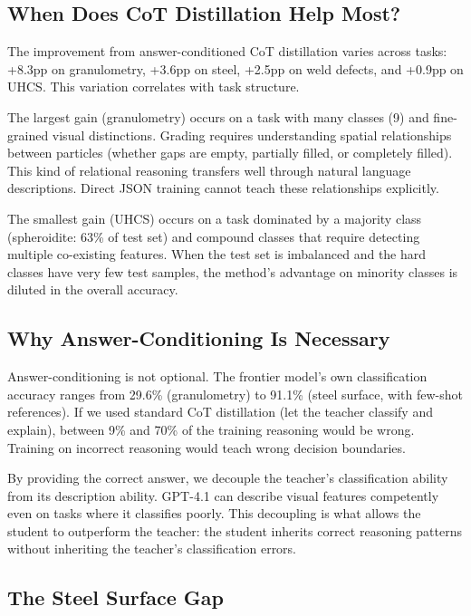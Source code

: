\documentclass{bmvc2k}
\begin{document}
\subsection{When Does CoT Distillation Help Most?}

The improvement from answer-conditioned CoT distillation varies across tasks: +8.3pp on granulometry, +3.6pp on steel, +2.5pp on weld defects, and +0.9pp on UHCS. This variation correlates with task structure.

The largest gain (granulometry) occurs on a task with many classes (9) and fine-grained visual distinctions. Grading requires understanding spatial relationships between particles (whether gaps are empty, partially filled, or completely filled). This kind of relational reasoning transfers well through natural language descriptions. Direct JSON training cannot teach these relationships explicitly.

The smallest gain (UHCS) occurs on a task dominated by a majority class (spheroidite: 63\% of test set) and compound classes that require detecting multiple co-existing features. When the test set is imbalanced and the hard classes have very few test samples, the method's advantage on minority classes is diluted in the overall accuracy.

\subsection{Why Answer-Conditioning Is Necessary}

Answer-conditioning is not optional. The frontier model's own classification accuracy ranges from 29.6\% (granulometry) to 91.1\% (steel surface, with few-shot references). If we used standard CoT distillation (let the teacher classify and explain), between 9\% and 70\% of the training reasoning would be wrong. Training on incorrect reasoning would teach wrong decision boundaries.

By providing the correct answer, we decouple the teacher's classification ability from its description ability. GPT-4.1 can describe visual features competently even on tasks where it classifies poorly. This decoupling is what allows the student to outperform the teacher: the student inherits correct reasoning patterns without inheriting the teacher's classification errors.

\subsection{The Steel Surface Gap}
\end{document}

